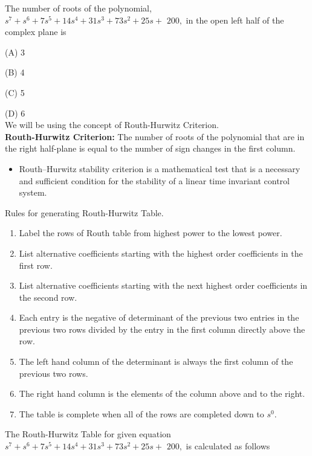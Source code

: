 The number of roots of the polynomial, $s^{7}+s^{6}+7 s^{5}+14 s^{4}+31s^{3}+73 s^{2}+25 s+$ $200,$ in the open left half of the complex plane is

(A) 3

(B) 4

(C) 5

(D) 6\\
We will be using the concept of Routh-Hurwitz Criterion.\\
\textbf{Routh-Hurwitz Criterion:} The number of roots of the polynomial that are in the right half-plane is equal to
the number of sign changes in the first column.

\begin{itemize}
    \item Routh–Hurwitz stability criterion is a mathematical test that is a necessary and sufficient condition for the stability of a linear time invariant control system.
\end{itemize}

Rules for generating Routh-Hurwitz Table.

\begin{enumerate}
    \item Label the rows of Routh table from highest power to the lowest power.
    \item List alternative coefficients starting with the highest order coefficients in the first row.
    \item List alternative coefficients starting with the next highest order coefficients in the second row.
    \item Each entry is the negative of determinant of the previous two entries in the previous two rows divided by the entry in the first column directly above the row.
    \item The left hand column of the determinant is always the first column of the previous two rows.
    \item The right hand column is the elements of the column above and to the right.
    \item The table is complete when all of the rows are completed down to $s^0$.
\end{enumerate}
The Routh-Hurwitz Table for given equation $s^{7}+s^{6}+7 s^{5}+14 s^{4}+31s^{3}+73 s^{2}+25 s+$ $200,$ is calculated as follows

